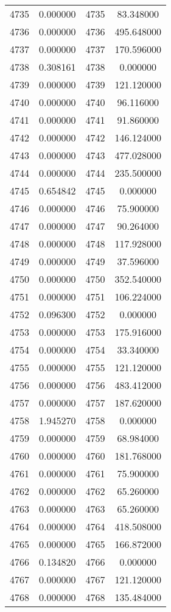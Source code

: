 \documentclass[12pt]{article}
\begin{document}
\begin{longtable}{@{}cccc@{}}
4735 & 0.000000 & 4735 & 83.348000 \\
4736 & 0.000000 & 4736 & 495.648000 \\
4737 & 0.000000 & 4737 & 170.596000 \\
4738 & 0.308161 & 4738 & 0.000000 \\
4739 & 0.000000 & 4739 & 121.120000 \\
4740 & 0.000000 & 4740 & 96.116000 \\
4741 & 0.000000 & 4741 & 91.860000 \\
4742 & 0.000000 & 4742 & 146.124000 \\
4743 & 0.000000 & 4743 & 477.028000 \\
4744 & 0.000000 & 4744 & 235.500000 \\
4745 & 0.654842 & 4745 & 0.000000 \\
4746 & 0.000000 & 4746 & 75.900000 \\
4747 & 0.000000 & 4747 & 90.264000 \\
4748 & 0.000000 & 4748 & 117.928000 \\
4749 & 0.000000 & 4749 & 37.596000 \\
4750 & 0.000000 & 4750 & 352.540000 \\
4751 & 0.000000 & 4751 & 106.224000 \\
4752 & 0.096300 & 4752 & 0.000000 \\
4753 & 0.000000 & 4753 & 175.916000 \\
4754 & 0.000000 & 4754 & 33.340000 \\
4755 & 0.000000 & 4755 & 121.120000 \\
4756 & 0.000000 & 4756 & 483.412000 \\
4757 & 0.000000 & 4757 & 187.620000 \\
4758 & 1.945270 & 4758 & 0.000000 \\
4759 & 0.000000 & 4759 & 68.984000 \\
4760 & 0.000000 & 4760 & 181.768000 \\
4761 & 0.000000 & 4761 & 75.900000 \\
4762 & 0.000000 & 4762 & 65.260000 \\
4763 & 0.000000 & 4763 & 65.260000 \\
4764 & 0.000000 & 4764 & 418.508000 \\
4765 & 0.000000 & 4765 & 166.872000 \\
4766 & 0.134820 & 4766 & 0.000000 \\
4767 & 0.000000 & 4767 & 121.120000 \\
4768 & 0.000000 & 4768 & 135.484000 \\

\end{longtable}
\end{document}
